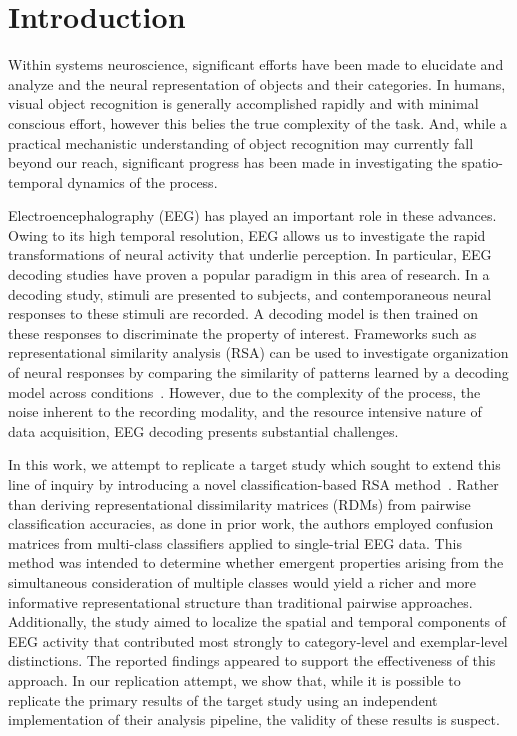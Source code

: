 
\section{Introduction}
Within systems neuroscience, significant efforts have been made to elucidate and analyze and the neural representation of objects and their categories. In humans, visual object recognition is generally accomplished rapidly and with minimal conscious effort, however this belies the true complexity of the task. And, while a practical mechanistic understanding of object recognition may currently fall beyond our reach, significant progress has been made in investigating the spatio-temporal dynamics of the process. 

Electroencephalography (EEG) has played an important role in these advances. Owing to its high temporal resolution, EEG allows us to investigate the rapid transformations of neural activity that underlie perception. In particular, EEG decoding studies have proven a popular paradigm in this area of research. In a decoding study, stimuli are presented to subjects, and contemporaneous neural responses to these stimuli are recorded. A decoding model is then trained on these responses to discriminate the property of interest. Frameworks such as representational similarity analysis (RSA) can be used to investigate organization of neural responses by comparing the similarity of patterns learned by a decoding model across conditions~\cite{Kriegeskorte:2008}. However, due to the complexity of the process, the noise inherent to the recording modality, and the resource intensive nature of data acquisition, EEG decoding presents substantial challenges.  

In this work, we attempt to replicate a target study which sought to extend this line of inquiry by introducing a novel classification-based RSA method~\cite{Kaneshiro:2015}. Rather than deriving representational dissimilarity matrices (RDMs) from pairwise classification accuracies, as done in prior work, the authors employed confusion matrices from multi-class classifiers applied to single-trial EEG data. This method was intended to determine whether emergent properties arising from the simultaneous consideration of multiple classes would yield a richer and more informative representational structure than traditional pairwise approaches. Additionally, the study aimed to localize the spatial and temporal components of EEG activity that contributed most strongly to category-level and exemplar-level distinctions. The reported findings appeared to support the effectiveness of this approach. In our replication attempt, we show that, while it is possible to replicate the primary results of the target study using an independent implementation of their analysis pipeline, the validity of these results is suspect. 

